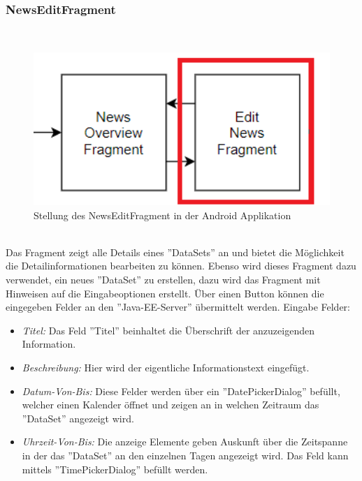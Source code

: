 \subsubsection{NewsEditFragment}
\\
\begin{figure}[H]
\centering
\includegraphics[width=1.0\textwidth]{images/06_AndroidApp/06_NewsEditStellung}
\caption{Stellung des NewsEditFragment in der Android Applikation}
\label{fig:mediaNav}
\end{figure}
\\
Das Fragment zeigt alle Details eines ''DataSets'' an und bietet die Möglichkeit die Detailinformationen bearbeiten zu können. Ebenso wird dieses Fragment dazu verwendet, ein neues ''DataSet'' zu erstellen, dazu wird das Fragment mit Hinweisen auf die Eingabeoptionen erstellt. Über einen Button können die eingegeben Felder an den ''Java-EE-Server'' übermittelt werden. Eingabe Felder:
\begin{itemize}
	\item {\em Titel:} Das Feld ''Titel'' beinhaltet die Überschrift der anzuzeigenden Information.
	\item {\em Beschreibung:} Hier wird der eigentliche Informationstext eingefügt.
	\item{\em Datum-Von-Bis:} Diese Felder werden über ein ''DatePickerDialog'' befüllt, welcher einen Kalender öffnet und zeigen an in welchen Zeitraum das ''DataSet'' angezeigt wird. 
	\item {\em Uhrzeit-Von-Bis:} Die anzeige Elemente geben Auskunft über die Zeitspanne in der das ''DataSet'' an den einzelnen Tagen angezeigt wird. Das Feld kann mittels ''TimePickerDialog'' befüllt werden.		
\end{itemize}
